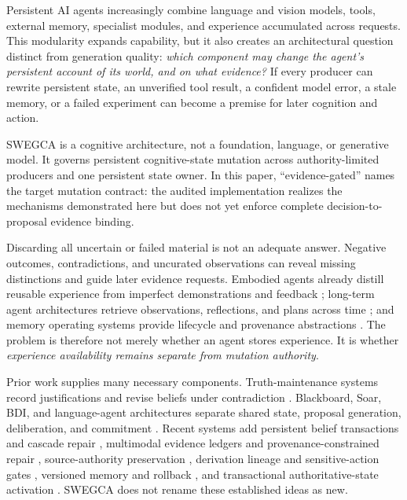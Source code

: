 \documentclass[10pt]{article}
\newcommand{\swegca}{\textsc{SWEGCA}}
\begin{document}
Persistent AI agents increasingly combine language and vision models, tools, external memory, specialist modules, and experience accumulated across requests. This modularity expands capability, but it also creates an architectural question distinct from generation quality: \emph{which component may change the agent's persistent account of its world, and on what evidence?} If every producer can rewrite persistent state, an unverified tool result, a confident model error, a stale memory, or a failed experiment can become a premise for later cognition and action.

\swegca{} is a cognitive architecture, not a foundation, language, or generative model. It governs persistent cognitive-state mutation across authority-limited producers and one persistent state owner. In this paper, ``evidence-gated'' names the target mutation contract: the audited implementation realizes the mechanisms demonstrated here but does not yet enforce complete decision-to-proposal evidence binding.

Discarding all uncertain or failed material is not an adequate answer. Negative outcomes, contradictions, and uncurated observations can reveal missing distinctions and guide later evidence requests. Embodied agents already distill reusable experience from imperfect demonstrations and feedback \cite{sarch2024ical}; long-term agent architectures retrieve observations, reflections, and plans across time \cite{park2023generative,packer2023memgpt}; and memory operating systems provide lifecycle and provenance abstractions \cite{li2025memos}. The problem is therefore not merely whether an agent stores experience. It is whether \emph{experience availability remains separate from mutation authority}.

Prior work supplies many necessary components. Truth-maintenance systems record justifications and revise beliefs under contradiction \cite{doyle1979tms,dekleer1986atms}. Blackboard, Soar, BDI, and language-agent architectures separate shared state, proposal generation, deliberation, and commitment \cite{erman1980hearsay,laird2022soar,rao1995bdi,sumers2024coala}. Recent systems add persistent belief transactions and cascade repair \cite{li2026memtx}, multimodal evidence ledgers and provenance-constrained repair \cite{du2026ledgermind}, source-authority preservation \cite{xu2026provenance,zhan2026authority}, derivation lineage and sensitive-action gates \cite{ouyang2026memlineage}, versioned memory and rollback \cite{park2026kumiho,su2026chronomem}, and transactional authoritative-state activation \cite{he2026continuity}. \swegca{} does not rename these established ideas as new.
\end{document}
